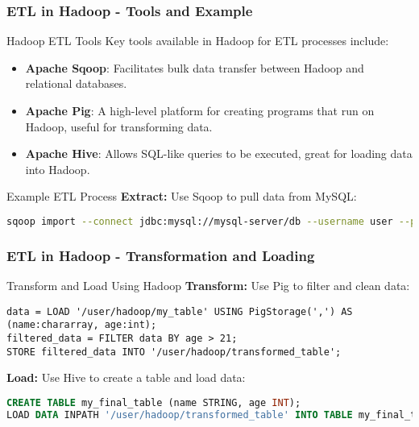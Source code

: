 \documentclass[aspectratio=169]{beamer}
\begin{document}
\begin{frame}[fragile]
    \frametitle{ETL in Hadoop - Tools and Example}
    \begin{block}{Hadoop ETL Tools}
        Key tools available in Hadoop for ETL processes include:
        \begin{itemize}
            \item \textbf{Apache Sqoop}: Facilitates bulk data transfer between Hadoop and relational databases.
            \item \textbf{Apache Pig}: A high-level platform for creating programs that run on Hadoop, useful for transforming data.
            \item \textbf{Apache Hive}: Allows SQL-like queries to be executed, great for loading data into Hadoop.
        \end{itemize}
    \end{block}
    \begin{block}{Example ETL Process}
        \textbf{Extract:} Use Sqoop to pull data from MySQL:
        \begin{lstlisting}[language=bash]
sqoop import --connect jdbc:mysql://mysql-server/db --username user --password pass --table my_table --target-dir /user/hadoop/my_table
        \end{lstlisting}
    \end{block}
\end{frame}

\begin{frame}[fragile]
    \frametitle{ETL in Hadoop - Transformation and Loading}
    \begin{block}{Transform and Load Using Hadoop}
        \textbf{Transform:} Use Pig to filter and clean data:
        \begin{lstlisting}[language=Pig]
data = LOAD '/user/hadoop/my_table' USING PigStorage(',') AS (name:chararray, age:int);
filtered_data = FILTER data BY age > 21;
STORE filtered_data INTO '/user/hadoop/transformed_table';
        \end{lstlisting}
        
        \textbf{Load:} Use Hive to create a table and load data:
        \begin{lstlisting}[language=sql]
CREATE TABLE my_final_table (name STRING, age INT);
LOAD DATA INPATH '/user/hadoop/transformed_table' INTO TABLE my_final_table;
        \end{lstlisting}
    \end{block}
\end{frame}
\end{document}
